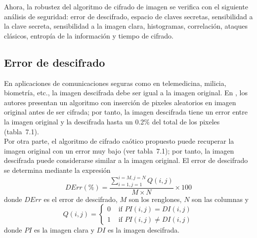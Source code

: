 Ahora, la robustez del algoritmo de cifrado de imagen se verifica con el siguiente análisis de seguridad: error de descifrado, espacio de claves secretas, sensibilidad a la clave secreta, sensibilidad a la imagen clara, histogramas, correlación, ataques clásicos, entropía de la información y tiempo de cifrado.

\subsection{Error de descifrado}
En aplicaciones de comunicaciones seguras como en telemedicina, milicia, biometría, etc., la imagen descifrada debe ser igual a la imagen original. En \cite{ZEtAl_2014}, los autores presentan un algoritmo con inserción de pixeles aleatorios en imagen original antes de ser cifrada; por tanto, la imagen descifrada tiene un error entre la imagen original y la descifrada hasta un 0.2\% del total de los pixeles (tabla~7.1). \\

Por otra parte, el algoritmo de cifrado caótico propuesto puede recuperar la imagen original con un error muy bajo (ver tabla~7.1); por tanto, la imagen descifrada puede considerarse similar a la imagen original. El error de descifrado se determina mediante la expresión
\begin{equation}
DErr(\%)=\frac{\sum_{i=1,j=1}^{i=M,j=N}Q(i,j)}{M\times N} \times 100
\end{equation}
donde $DErr$ es el error de descifrado, $M$ son los renglones, $N$ son las columnas y 
\begin{equation}
Q(i,j) = \left\{ \begin{array}{rl}
 0 &\mbox{ if $PI(i,j)=DI(i,j)$} \\
 1 &\mbox{ if $PI(i,j)\neq DI(i,j)$}
       \end{array} \right.
\end{equation}
donde $PI$ es la imagen clara y $DI$ es la imagen descifrada.

\begin{table}[!htbp] %
	\center
	\caption{Error de descifrado de imagen RGB para dos imágenes.}
\end{table} 

